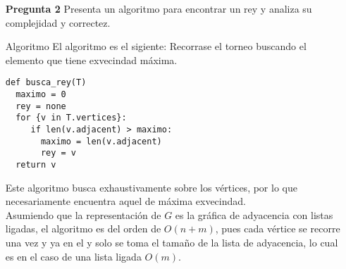 \documentclass[12pt]{article}
\begin{document}
\lstset{language=python}

\begin{itemize}
\item[\bf{Pregunta 2}] Presenta un algoritmo para encontrar un rey y analiza su complejidad y correctez.

\item[Algoritmo]
  El algoritmo es el sigiente:
  Recorrase el torneo buscando el elemento que tiene exvecindad máxima.

\begin{lstlisting}[frame=single] 
  def busca_rey(T)
  maximo = 0
  rey = none
  for {v in T.vertices}:
     if len(v.adjacent) > maximo:
       maximo = len(v.adjacent)
       rey = v
  return v
\end{lstlisting}

Este algoritmo busca exhaustivamente sobre los vértices, por lo que necesariamente encuentra aquel de máxima exvecindad.\\
Asumiendo que la representación de $G$ es la gráfica de adyacencia con listas ligadas, el algoritmo es del orden de $O(n + m)$, pues cada vértice se recorre una vez y ya en el y solo se toma el tamaño de la lista de adyacencia, lo cual es en el caso de una lista ligada $O(m)$.

\end{itemize}
\end{document}
